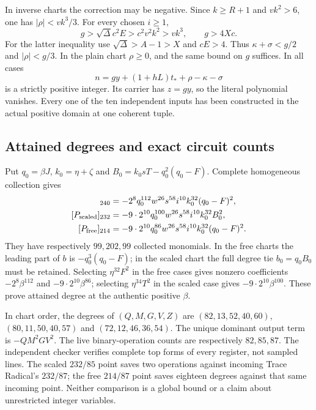 In inverse charts the correction may be negative. Since $k\ge R+1$
and $vk^2>6$, one has $|\rho|<vk^3/3$. For every chosen $i\ge1$,
\[
 g>\sqrt\Delta c^2E>c^2v^2k^2>vk^3,\qquad g>4Xc.
\]
For the latter inequality use $\sqrt\Delta>A-1>X$ and $cE>4$.
Thus $\kappa+\sigma<g/2$ and $|\rho|<g/3$.
In the plain chart $\rho\ge0$, and the same bound on $g$ suffices.
In all cases
\[
 n=gy+(1+hL)t_*+\rho-\kappa-\sigma
\]
is a strictly positive integer. Its carrier has $z=gy$, so the literal
polynomial vanishes. Every one of the ten independent inputs has been
constructed in the actual positive domain at one coherent tuple.

\subsection{Attained degrees and exact circuit counts}
Put $q_0=\beta J$, $k_0=\eta+\zeta$ and
$B_0=k_0sT-q_0^2(q_0-F)$. Complete homogeneous collection gives
\begin{align*}
 [P_{\rm plain}]_{240}
 &=-2^8q_0^{112}w^{26}s^{58}i^{10}k_0^{32}(q_0-F)^2,\\
 [P_{\rm scaled}]_{232}
 &=-9\cdot2^{10}q_0^{100}w^{26}s^{58}i^{10}k_0^{32}B_0^2,\\
 [P_{\rm free}]_{214}
 &=-9\cdot2^{10}q_0^{86}w^{26}s^{58}i^{10}k_0^{32}(q_0-F)^2.
\end{align*}
They have respectively $99,202,99$ collected monomials. In the free
charts the leading part of $b$ is $-q_0^3(q_0-F)$; in the scaled
chart the full degree tie $b_0=q_0B_0$ must be retained.
Selecting $\eta^{32}F^2$ in the free cases gives nonzero coefficients
$-2^8\beta^{112}$ and $-9\cdot2^{10}\beta^{86}$; selecting
$\eta^{34}T^2$ in the scaled case gives $-9\cdot2^{10}\beta^{100}$.
These prove attained degree at the authentic positive $\beta$.

In chart order, the degrees of $(Q,M,G,V,Z)$ are
$(82,13,52,40,60)$, $(80,11,50,40,57)$ and $(72,12,46,36,54)$.
The unique dominant output term is $-QM^2GV^2$.
The live binary-operation counts are respectively $82,85,87$.
The independent checker verifies complete top forms of every register,
not sampled lines. The scaled $232/85$ point saves two operations against
incoming Trace Radical's $232/87$; the free $214/87$ point saves eighteen
degrees against that same incoming point. Neither comparison is a global
bound or a claim about unrestricted integer variables.

